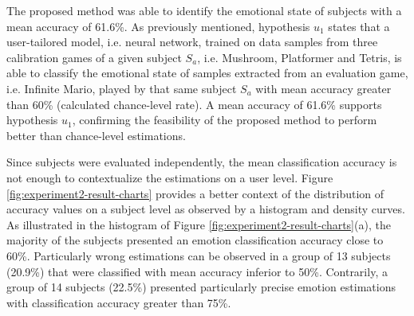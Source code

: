 The proposed method was able to identify the emotional state of subjects with a mean accuracy of 61.6\%. As previously mentioned, hypothesis $u_1$ states that a user-tailored model, i.e. neural network, trained on data samples from three calibration games of a given subject $S_a$, i.e. Mushroom, Platformer and Tetris, is able to classify the emotional state of samples extracted from an evaluation game, i.e. Infinite Mario, played by that same subject $S_a$ with mean accuracy greater than 60\% (calculated chance-level rate). A mean accuracy of 61.6\% supports hypothesis $u_1$, confirming the feasibility of the proposed method to perform better than chance-level estimations.

Since subjects were evaluated independently, the mean classification accuracy is not enough to contextualize the estimations on a user level. Figure \ref{fig:experiment2-result-charts} provides a better context of the distribution of accuracy values on a subject level as observed by a histogram and density curves. As illustrated in the histogram of Figure \ref{fig:experiment2-result-charts}(a), the majority of the subjects presented an emotion classification accuracy close to 60\%. Particularly wrong estimations can be observed in a group of 13 subjects (20.9\%) that were classified with mean accuracy inferior to 50\%. Contrarily, a group of 14 subjects (22.5\%) presented particularly precise emotion estimations with classification accuracy greater than 75\%.

